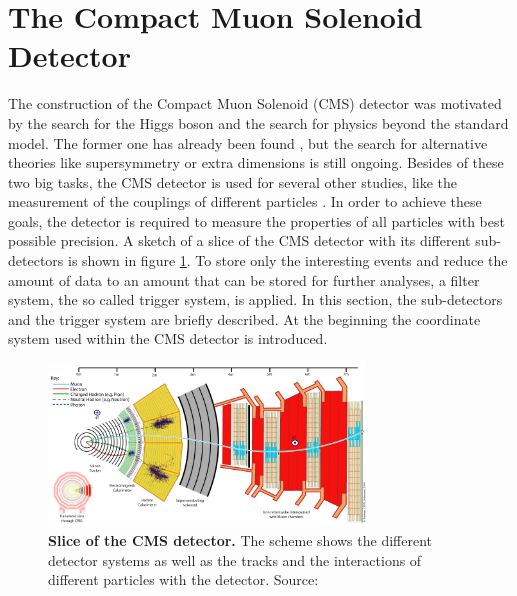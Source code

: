 \section{The Compact Muon Solenoid Detector}
The construction of the Compact Muon Solenoid (CMS) detector \cite{CMSDesignReport} was motivated by the search for the Higgs boson and the search for physics beyond the standard model. The former one has already been found \cite{ATLAS_higgs_1207,CMS_higgs_1207}, but the search for alternative theories like supersymmetry or extra dimensions is still ongoing. Besides of these two big tasks, the CMS detector is used for several other studies, like the measurement of the couplings of different particles \cite{tHq}.
In order to achieve these goals, the detector is required to measure the properties of all particles with best possible precision. A sketch of a slice of the CMS detector with its different sub-detectors is shown in figure \ref{fig:ch_2_cmsslice}. To store only the interesting events and reduce the amount of data to an amount that can be stored for further analyses, a filter system, the so called trigger system, is applied. In this section, the sub-detectors and the trigger system are briefly described. At the beginning the coordinate system used within the CMS detector is introduced.

\begin{figure}
\centering
\includegraphics[width=0.75\textwidth]{assets/CMS_Slice.png}
\caption[CMS Detector Slice]{\textbf{Slice of the CMS detector.} The scheme shows the different detector systems as well as the tracks and the interactions of different particles with the detector. Source: \cite{cmsslice}}
\label{fig:ch_2_cmsslice}
\end{figure}

